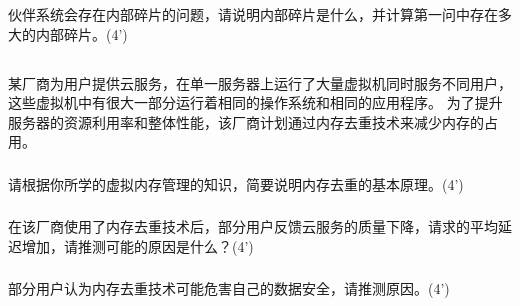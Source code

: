 \documentclass[a4paper,12pt]{article}
\newcommand{\score}[1]{(#1')}
\begin{document}
\subsubsection{}

伙伴系统会存在内部碎片的问题，请说明内部碎片是什么，并计算第一问中存在多大的内部碎片。\score{4}

\begin{answer}
  \lipsum[3]
\end{answer}

\subsection{}

某厂商为用户提供云服务，在单一服务器上运行了大量虚拟机同时服务不同用户，这些虚拟机中有很大一部分运行着相同的操作系统和相同的应用程序。
为了提升服务器的资源利用率和整体性能，该厂商计划通过内存去重技术来减少内存的占用。

\subsubsection{}

请根据你所学的虚拟内存管理的知识，简要说明内存去重的基本原理。\score{4}

\begin{answer}
  \lipsum[3]
\end{answer}

\subsubsection{}

在该厂商使用了内存去重技术后，部分用户反馈云服务的质量下降，请求的平均延迟增加，请推测可能的原因是什么？\score{4}

\begin{answer}
  \lipsum[3]
\end{answer}

\subsubsection{}

部分用户认为内存去重技术可能危害自己的数据安全，请推测原因。\score{4}

\begin{answer}
  \lipsum[3]
\end{answer}

\subsection{}
\end{document}
